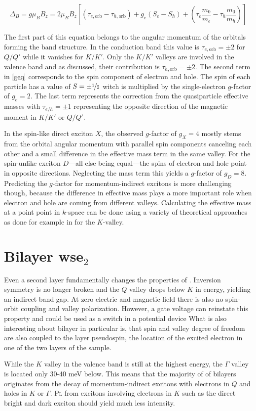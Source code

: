 \[\Delta_B=g\mu_BB_z = 2\mu_BB_z\left[(\tau_{e, \mathrm{orb}}-\tau_{h, \mathrm{orb}})+g_e(S_e-S_h) + \left(\tau_e \frac{m_0}{m_e}-\tau_h \frac{m_0}{m_h}\right)\right]\label{geq}\]

The first part of this equation belongs to the angular momentum of the orbitals forming the band structure. In the conduction band this value is $\tau_{e, \mathrm{orb}}=\pm2$ for $Q/Q'$ while it vanishes for $K/K'$. Only the $K/K'$ valleys are involved in the valence band and as discussed, their contribution is $\tau_{h, \mathrm{orb}}=\pm2$. The second term in \eqref{geq} corresponds to the spin component of electron and hole. The spin of each particle has a value of $S=\pm\nicefrac{1}{2}$ witch is multiplied by the single-electron $g$-factor of $g_e=2$. The last term represents the correction from the quasiparticle effective masses with $\tau_{e/h}=\pm1$ representing the opposite direction of the magnetic moment in $K/K'$ or $Q/Q'$.

In the spin-like direct exciton $X$, the observed $g$-factor of $g_X=4$ mostly stems from the orbital angular momentum with parallel spin components canceling each other and a small difference in the effective mass term in the same valley. For the spin-unlike exciton $D$---all else being equal---the spins of electron and hole point in opposite directions. Neglecting the mass term this yields a $g$-factor of $g_D=8$. Predicting the $g$-factor for momentum-indirect excitons is more challenging though, because the difference in effective mass plays a more important role when electron and hole are coming from different valleys. Calculating the effective mass at a point point in $k$-space can be done using a variety of theoretical approaches as done for example in \cite{rybkovskiy_atomically_2017} for the $K$-valley.

\section{Bilayer ws\textup{e}$_2$}

Even a second layer fundamentally changes the properties of \wse\!. Inversion symmetry is no longer broken and the $Q$ valley drops below $K$ in energy, yielding an indirect band gap\cite{zibouche_transition-metal_2014_2}. At zero electric and magnetic field there is also no spin-orbit coupling and valley polarization. However, a gate voltage can reinstate this property and could be used as a switch in a potential device\cite{zibouche_transition-metal_2014} What is also interesting about bilayer \wse in particular is, that spin and valley degree of freedom are also coupled to the layer pseudospin, the location of the excited electron in one of the two layers of the sample\cite{jones_spin-layer_2014}.

While the $K$ valley in the valence band is still at the highest energy, the $\Gamma$ valley is located only 30-40 meV below. This means that the majority of \pl of \wse bilayers originates from the decay of momentum-indirect excitons with electrons in $Q$ and holes in $K$ or $\Gamma$. \textsc{Pl} from excitons involving electrons in $K$ such as the direct bright and dark exciton should yield much less intensity.